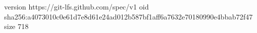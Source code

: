 version https://git-lfs.github.com/spec/v1
oid sha256:a4073010c0e61d7e8d61e24ad012b587bf1aff6a7632e70180990e4bbab72f47
size 718
